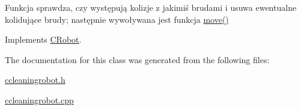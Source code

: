 Funkcja sprawdza, czy występują kolizje z jakimiś brudami i usuwa ewentualne kolidujące brudy; następnie wywoływana jest funkcja \mbox{\hyperlink{class_c_cleaning_robot_a1ad227a5f3508a8e78fcecae7d3de53b}{move()}} 



Implements \mbox{\hyperlink{class_c_robot_a8ad8d55a840ced20f85a2a045e9e24ef}{C\+Robot}}.



The documentation for this class was generated from the following files\+:\begin{DoxyCompactItemize}
\item 
\mbox{\hyperlink{ccleaningrobot_8h}{ccleaningrobot.\+h}}\item 
\mbox{\hyperlink{ccleaningrobot_8cpp}{ccleaningrobot.\+cpp}}\end{DoxyCompactItemize}
